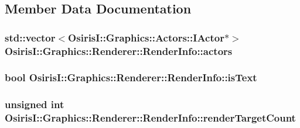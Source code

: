 \subsection{Member Data Documentation}
\hypertarget{struct_osiris_i_1_1_graphics_1_1_renderer_1_1_render_info_aa4e8a7cd019112f24509eb8479449c68}{
\subsubsection[{actors}]{\setlength{\rightskip}{0pt plus 5cm}std\-::vector$<${\bf Osiris\-I\-::\-Graphics\-::\-Actors\-::\-I\-Actor}$\ast$$>$ Osiris\-I\-::\-Graphics\-::\-Renderer\-::\-Render\-Info\-::actors}}\label{struct_osiris_i_1_1_graphics_1_1_renderer_1_1_render_info_aa4e8a7cd019112f24509eb8479449c68}
\hypertarget{struct_osiris_i_1_1_graphics_1_1_renderer_1_1_render_info_a681d2cb31ae2107220c3647c95985b30}{
\subsubsection[{is\-Text}]{\setlength{\rightskip}{0pt plus 5cm}bool Osiris\-I\-::\-Graphics\-::\-Renderer\-::\-Render\-Info\-::is\-Text}}\label{struct_osiris_i_1_1_graphics_1_1_renderer_1_1_render_info_a681d2cb31ae2107220c3647c95985b30}
\hypertarget{struct_osiris_i_1_1_graphics_1_1_renderer_1_1_render_info_af7e7f97ccae9502ab5472d4c66352e13}{
\subsubsection[{render\-Target\-Count}]{\setlength{\rightskip}{0pt plus 5cm}unsigned int Osiris\-I\-::\-Graphics\-::\-Renderer\-::\-Render\-Info\-::render\-Target\-Count}}\label{struct_osiris_i_1_1_graphics_1_1_renderer_1_1_render_info_af7e7f97ccae9502ab5472d4c66352e13}
